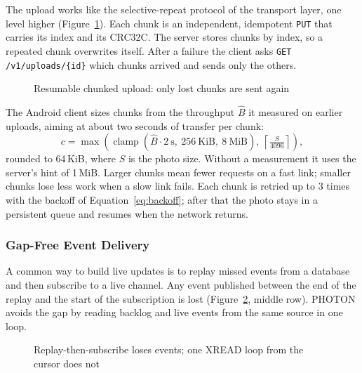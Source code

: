 The upload works like the selective-repeat protocol of the transport layer, one level higher (Figure~\ref{fig:chunks}). Each chunk is an independent, idempotent \texttt{PUT} that carries its index and its CRC32C. The server stores chunks by index, so a repeated chunk overwrites itself. After a failure the client asks \texttt{GET /v1/uploads/\{id\}} which chunks arrived and sends only the others.

\begin{figure}[H]
\centering
{}
\caption{Resumable chunked upload: only lost chunks are sent again}\label{fig:chunks}
\end{figure}

The Android client sizes chunks from the throughput $\hat{B}$ it measured on earlier uploads, aiming at about two seconds of transfer per chunk:
\begin{equation}\label{eq:chunk}
  c = \max\!\left(\operatorname{clamp}\!\left(\hat{B}\cdot 2\ \text{s},\ 256\ \text{KiB},\ 8\ \text{MiB}\right),\ \left\lceil \tfrac{S}{4096} \right\rceil\right),
\end{equation}
rounded to 64\,KiB, where $S$ is the photo size. Without a measurement it uses the server's hint of 1\,MiB. Larger chunks mean fewer requests on a fast link; smaller chunks lose less work when a slow link fails. Each chunk is retried up to 3 times with the backoff of Equation~\ref{eq:backoff}; after that the photo stays in a persistent queue and resumes when the network returns.

\subsubsection{Gap-Free Event Delivery}

A common way to build live updates is to replay missed events from a database and then subscribe to a live channel. Any event published between the end of the replay and the start of the subscription is lost (Figure~\ref{fig:eventloop}, middle row). PHOTON avoids the gap by reading backlog and live events from the same source in one loop.

\begin{figure}[H]
\centering
{}
\caption{Replay-then-subscribe loses events; one XREAD loop from the cursor does not}\label{fig:eventloop}
\end{figure}

